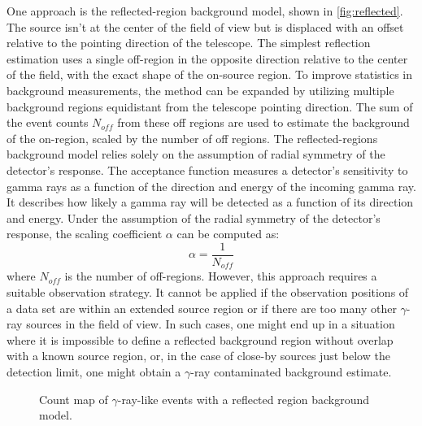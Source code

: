 One approach is the reflected-region background model, shown in \autoref{fig:reflected}. The source isn't at the center of the field of view but is displaced with an offset relative to the pointing direction of the telescope. The simplest reflection estimation uses a single off-region in the opposite direction relative to the center of the field, with the exact shape of the on-source region. To improve statistics in background measurements, the method can be expanded by utilizing multiple background regions equidistant from the telescope pointing direction. The sum of the event counts $N_{off}$ from these off regions are used to estimate the background of the on-region, scaled by the number of off regions. 
The reflected-regions background model relies solely on the assumption of radial symmetry of the detector's response. The acceptance function measures a detector's sensitivity to gamma rays as a function of the direction and energy of the incoming gamma ray. It describes how likely a gamma ray will be detected as a function of its direction and energy. Under the assumption of the radial symmetry of the detector's response, the scaling coefficient $\alpha$ can be computed as: 
\begin{equation}
    \alpha=\frac{1}{N_{off}}
\end{equation}
where $N_{off}$ is the number of off-regions.
However, this approach requires a suitable observation strategy. It cannot be applied if the observation positions of a data set are within an extended source region or if there are too many other $\gamma$-ray sources in the field of view. In such cases, one might end up in a situation where it is impossible to define a reflected background region without overlap with a known source region, or, in the case of close-by sources just below the detection limit, one might obtain a $\gamma$-ray contaminated background estimate.
 \begin{figure}[t]
\centering

\caption{Count map of $\gamma$-ray-like events with a reflected region background model.}
\label{fig:reflected}
\end{figure}



